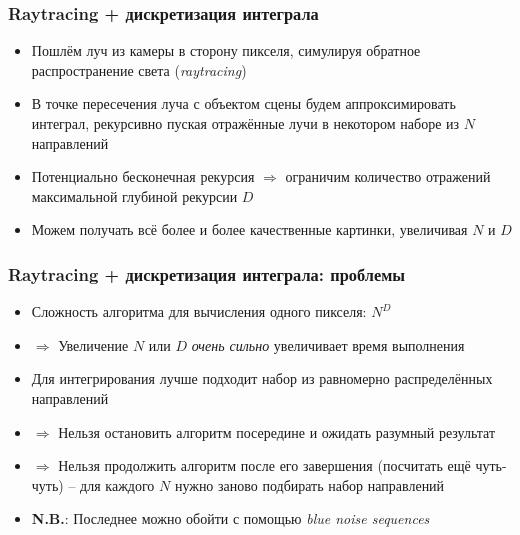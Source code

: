 \documentclass[handout,10pt]{beamer}
\begin{document}
\begin{frame}[fragile]
\frametitle{Raytracing + дискретизация интеграла}
\begin{itemize}
\item Пошлём луч из камеры в сторону пикселя, симулируя обратное распространение света (\textit{raytracing})
\pause
\item В точке пересечения луча с объектом сцены будем аппроксимировать интеграл, рекурсивно пуская отражённые лучи в некотором наборе из \begin{math}N\end{math} направлений
\pause
\item Потенциально бесконечная рекурсия \begin{math}\Longrightarrow\end{math} ограничим количество отражений максимальной глубиной рекурсии \begin{math}D\end{math}
\pause
\item Можем получать всё более и более качественные картинки, увеличивая \begin{math}N\end{math} и \begin{math}D\end{math}
\end{itemize}
\end{frame}

\begin{frame}[fragile]
\frametitle{Raytracing + дискретизация интеграла: проблемы}
\begin{itemize}
\item Сложность алгоритма для вычисления одного пикселя: \begin{math}N^D\end{math}
\pause
\item \begin{math}\Longrightarrow\end{math} Увеличение \begin{math}N\end{math} или \begin{math}D\end{math} \textit{очень сильно} увеличивает время выполнения
\pause
\item Для интегрирования лучше подходит набор из равномерно распределённых направлений
\pause
\item \begin{math}\Longrightarrow\end{math} Нельзя остановить алгоритм посередине и ожидать разумный результат
\pause
\item \begin{math}\Longrightarrow\end{math} Нельзя продолжить алгоритм после его завершения (посчитать ещё чуть-чуть) -- для каждого \begin{math}N\end{math} нужно заново подбирать набор направлений
\pause
\item \alert{\textbf{N.B.}}: Последнее можно обойти с помощью \textit{blue noise sequences}
\end{itemize}
\end{frame}
\end{document}
